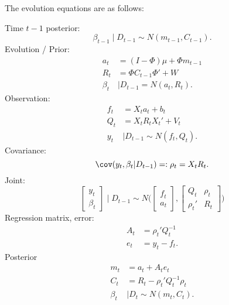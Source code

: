 \documentclass{article}
\begin{document}
The evolution equations are as follows:
\begin{outline}
\1 Time $t-1$ posterior:
\[
\beta_{t-1} \mid D_{t-1} \sim N(m_{t-1}, C_{t-1}).
\]
\1 Evolution / Prior:
\begin{align*}
a_t & = (I-\Phi) \mu + \Phi m_{t-1} \\
R_t & = \Phi C_{t-1} \Phi' + W \\
\beta_t & \mid D_{t-1} = N(a_t, R_t).
\end{align*}
\1 Observation:
\begin{align*}
f_t & = X_t a_t + b_t \\
Q_t & = X_t R_t X_t' + V_t \\
y_t & \mid D_{t-1} \sim N(f_t, Q_t).
\end{align*}
\1 Covariance:
\[
\cov(y_t, \beta_t | D_{t-1}) =: \rho_t = X_t R_t.
\]
\1 Joint:
\[
\begin{bmatrix}
y_t \\ \beta_t
\end{bmatrix}
\mid D_{t-1}
\sim
N
\Big(
\begin{bmatrix}
f_t \\ a_t
\end{bmatrix},
\begin{bmatrix}
Q_t & \rho_t \\
\rho_t' & R_t
\end{bmatrix}
\Big)
\]
\1 Regression matrix, error:
\begin{align*}
A_t & = \rho_t' Q_{t}^{-1} \\
e_t & = y_t - f_t.
\end{align*}
\1 Posterior
\begin{align*}
m_t & = a_t + A_t e_t \\
C_t & = R_t - \rho_t' Q_t^{-1} \rho_t \\
\beta_t & \mid D_t \sim N(m_t, C_t).
\end{align*}

\end{outline}
\end{document}

